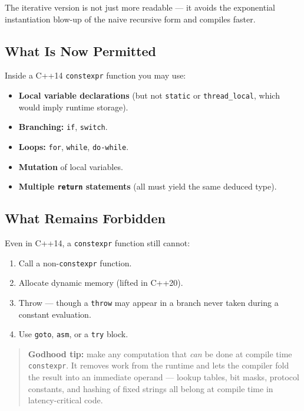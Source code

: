 The iterative version is not just more readable --- it avoids the exponential instantiation blow-up of the naive recursive form and compiles faster.

\subsection{What Is Now Permitted}

Inside a C++14 \texttt{constexpr} function you may use:

\begin{itemize}
    \item \textbf{Local variable declarations} (but not \texttt{static} or \texttt{thread\_local}, which would imply runtime storage).
    \item \textbf{Branching:} \texttt{if}, \texttt{switch}.
    \item \textbf{Loops:} \texttt{for}, \texttt{while}, \texttt{do-while}.
    \item \textbf{Mutation} of local variables.
    \item \textbf{Multiple \texttt{return} statements} (all must yield the same deduced type).
\end{itemize}

\subsection{What Remains Forbidden}

Even in C++14, a \texttt{constexpr} function still cannot:

\begin{enumerate}
    \item Call a non-\texttt{constexpr} function.
    \item Allocate dynamic memory (lifted in C++20).
    \item Throw --- though a \texttt{throw} may appear in a branch never taken during a constant evaluation.
    \item Use \texttt{goto}, \texttt{asm}, or a \texttt{try} block.
\end{enumerate}

\begin{quote}
\textbf{Godhood tip:} make any computation that \emph{can} be done at compile time \texttt{constexpr}. It removes work from the runtime and lets the compiler fold the result into an immediate operand --- lookup tables, bit masks, protocol constants, and hashing of fixed strings all belong at compile time in latency-critical code.
\end{quote}


